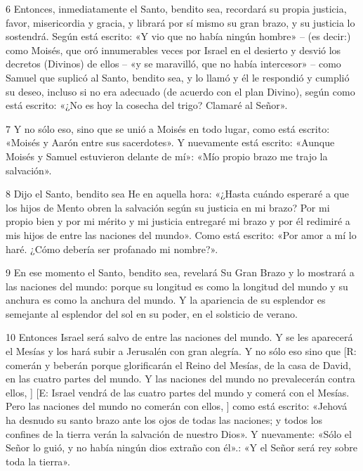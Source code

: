 \par 6 Entonces, inmediatamente el Santo, bendito sea, recordará su propia justicia, favor, misericordia y gracia, y librará por sí mismo su gran brazo, y su justicia lo sostendrá. Según está escrito: «Y vio que no había ningún hombre» – (es decir:) como Moisés, que oró innumerables veces por Israel en el desierto y desvió los decretos (Divinos) de ellos – «y se maravilló, que no había intercesor» – como Samuel que suplicó al Santo, bendito sea, y lo llamó y él le respondió y cumplió su deseo, incluso si no era adecuado (de acuerdo con el plan Divino), según como está escrito: «¿No es hoy la cosecha del trigo? Clamaré al Señor».

\par 7 Y no sólo eso, sino que se unió a Moisés en todo lugar, como está escrito: «Moisés y Aarón entre sus sacerdotes». Y nuevamente está escrito: «Aunque Moisés y Samuel estuvieron delante de mí»: «Mío propio brazo me trajo la salvación».

\par 8 Dijo el Santo, bendito sea He en aquella hora: «¿Hasta cuándo esperaré a que los hijos de Mento obren la salvación según su justicia en mi brazo? Por mi propio bien y por mi mérito y mi justicia entregaré mi brazo y por él redimiré a mis hijos de entre las naciones del mundo». Como está escrito: «Por amor a mí lo haré. ¿Cómo debería ser profanado mi nombre?».

\par 9 En ese momento el Santo, bendito sea, revelará Su Gran Brazo y lo mostrará a las naciones del mundo: porque su longitud es como la longitud del mundo y su anchura es como la anchura del mundo. Y la apariencia de su esplendor es semejante al esplendor del sol en su poder, en el solsticio de verano.

\par 10 Entonces Israel será salvo de entre las naciones del mundo. Y se les aparecerá el Mesías y los hará subir a Jerusalén con gran alegría. Y no sólo eso sino que [R: comerán y beberán porque glorificarán el Reino del Mesías, de la casa de David, en las cuatro partes del mundo. Y las naciones del mundo no prevalecerán contra ellos, ] [E: Israel vendrá de las cuatro partes del mundo y comerá con el Mesías. Pero las naciones del mundo no comerán con ellos, ] como está escrito: «Jehová ha desnudo su santo brazo ante los ojos de todas las naciones; y todos los confines de la tierra verán la salvación de nuestro Dios». Y nuevamente: «Sólo el Señor lo guió, y no había ningún dios extraño con él».: «Y el Señor será rey sobre toda la tierra».



